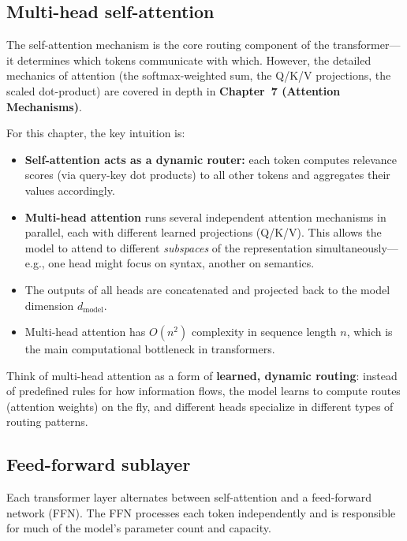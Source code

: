 \subsection{Multi-head self-attention}

The self-attention mechanism is the core routing component of the transformer—it determines which tokens communicate with which. However, the detailed mechanics of attention (the softmax-weighted sum, the Q/K/V projections, the scaled dot-product) are covered in depth in \textbf{Chapter~7 (Attention Mechanisms)}.

\begin{notebox}
For this chapter, the key intuition is:
\begin{itemize}
  \item \textbf{Self-attention acts as a dynamic router:} each token computes relevance scores (via query-key dot products) to all other tokens and aggregates their values accordingly.
  \item \textbf{Multi-head attention} runs several independent attention mechanisms in parallel, each with different learned projections (Q/K/V). This allows the model to attend to different \textit{subspaces} of the representation simultaneously—e.g., one head might focus on syntax, another on semantics.
  \item The outputs of all heads are concatenated and projected back to the model dimension $d_{\text{model}}$.
  \item Multi-head attention has $O(n^2)$ complexity in sequence length $n$, which is the main computational bottleneck in transformers.
\end{itemize}
\end{notebox}

\begin{intuitionbox}
Think of multi-head attention as a form of \textbf{learned, dynamic routing}: instead of predefined rules for how information flows, the model learns to compute routes (attention weights) on the fly, and different heads specialize in different types of routing patterns.
\end{intuitionbox}

\subsection{Feed-forward sublayer}

Each transformer layer alternates between self-attention and a feed-forward network (FFN). The FFN processes each token independently and is responsible for much of the model's parameter count and capacity.

